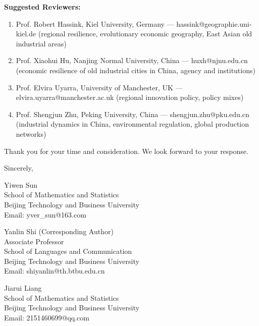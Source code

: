 \documentclass[12pt,a4paper]{article}
\begin{document}
\noindent\textbf{Suggested Reviewers:}
\begin{enumerate}
    \item Prof. Robert Hassink, Kiel University, Germany --- hassink@geographie.uni-kiel.de (regional resilience, evolutionary economic geography, East Asian old industrial areas)
    \item Prof. Xiaohui Hu, Nanjing Normal University, China --- huxh@njnu.edu.cn (economic resilience of old industrial cities in China, agency and institutions)
    \item Prof. Elvira Uyarra, University of Manchester, UK --- elvira.uyarra@manchester.ac.uk (regional innovation policy, policy mixes)
    \item Prof. Shengjun Zhu, Peking University, China --- shengjun.zhu@pku.edu.cn (industrial dynamics in China, environmental regulation, global production networks)
\end{enumerate}

Thank you for your time and consideration. We look forward to your response.

\vspace{1cm}

\noindent Sincerely,

\vspace{1cm}

\noindent Yiwen Sun\\
School of Mathematics and Statistics\\
Beijing Technology and Business University\\
Email: yver\_sun@163.com

\vspace{0.5cm}

\noindent Yanlin Shi (Corresponding Author)\\
Associate Professor\\
School of Languages and Communication\\
Beijing Technology and Business University\\
Email: shiyanlin@th.btbu.edu.cn

\vspace{0.5cm}

\noindent Jiarui Liang\\
School of Mathematics and Statistics\\
Beijing Technology and Business University\\
Email: 2151460699@qq.com
\end{document}
